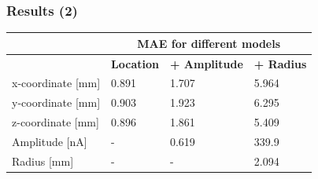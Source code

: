 \documentclass[aspectratio=169]{beamer}
\begin{document}
\begin{frame} \frametitle{Results (2)}
  \begin{table}
    \begin{tabular}{l|lll|}
      \cline{2-4}
      \rowcolor[HTML]{CBCEFB}
                                            & \multicolumn{3}{c|}{\cellcolor[HTML]{CBCEFB}\textbf{MAE for different models}}                                \\ \hline
      \rowcolor[HTML]{EFEFEF}
      \multicolumn{1}{|l|}{\textbf{Predictions}} & \cellcolor[HTML]{EFEFEF}\textbf{Location} & \cellcolor[HTML]{EFEFEF}\textbf{+ Amplitude} & \textbf{+ Radius} \\ \hline
      \multicolumn{1}{|l|}{x-coordinate [mm]} & 0.891                                     & 1.707                                       & 5.964             \\ \hline
      \multicolumn{1}{|l|}{y-coordinate [mm]} & 0.903                                     & 1.923                                       & 6.295             \\ \hline
      \multicolumn{1}{|l|}{z-coordinate [mm]} & 0.896                                     & 1.861                                       & 5.409             \\ \hline
      \multicolumn{1}{|l|}{Amplitude [nA]}   & -                                         & 0.619                                       & 339.9             \\ \hline
      \multicolumn{1}{|l|}{Radius [mm]}      & -                                         & -                                           & 2.094             \\ \hline
    \end{tabular}
  \end{table}
\end{frame}
\end{document}
